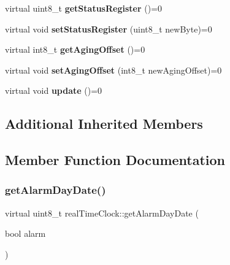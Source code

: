 \begin{DoxyCompactItemize}
\mbox{\label{classreal_time_clock_a38dcc51b0b30a5e480ea7f18f2c792ba}} 
virtual uint8\+\_\+t {\bfseries get\+Status\+Register} ()=0
\item 
\mbox{\label{classreal_time_clock_aa8ee80a7056c67543834508d0f04a218}} 
virtual void {\bfseries set\+Status\+Register} (uint8\+\_\+t new\+Byte)=0
\item 
\mbox{\label{classreal_time_clock_a2bc081385a6ad8273201d66217f8b2f0}} 
virtual int8\+\_\+t {\bfseries get\+Aging\+Offset} ()=0
\item 
\mbox{\label{classreal_time_clock_aacf97da86677ee3fb55b5180ba5c0727}} 
virtual void {\bfseries set\+Aging\+Offset} (int8\+\_\+t new\+Aging\+Offset)=0
\item 
\mbox{\label{classreal_time_clock_afb5132ca3cbe80552a88041cead0a2b3}} 
virtual void {\bfseries update} ()=0
\end{DoxyCompactItemize}
\subsection*{Additional Inherited Members}


\subsection{Member Function Documentation}
\mbox{\label{classreal_time_clock_afe0a54cb2f803d01df03e2ea8e86bbf9}} 
\subsubsection{\texorpdfstring{get\+Alarm\+Day\+Date()}{getAlarmDayDate()}}
{\footnotesize\ttfamily virtual uint8\+\_\+t real\+Time\+Clock\+::get\+Alarm\+Day\+Date (\begin{DoxyParamCaption}\item[{bool}]{alarm }\end{DoxyParamCaption})\hspace{0.3cm}{\ttfamily [pure virtual]}}



